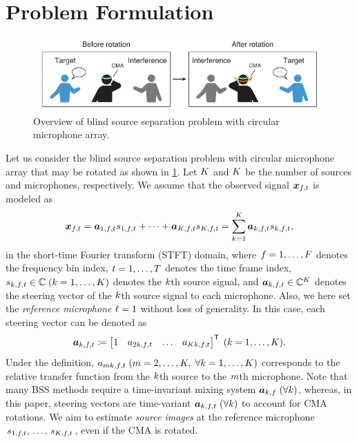 \documentclass[sip,biber]{now-journal}
\begin{document}
\section{Problem Formulation}\label{sec:problem}
\begin{figure}[t]
  \centering
  \includegraphics{figures/diagrams/bss.pdf}%
  \caption{Overview of blind source separation problem with circular microphone array.}%
  \label{fig:bss}
\end{figure}
Let us consider the blind source separation problem with circular microphone array that may be rotated as shown in \cref{fig:bss}.
Let $K$ and $K$ be the number of sources and microphones, respectively.
We assume that the observed signal $\Obs _{\ft}$ is modeled as
\begin{equation}
  \Obs _{\ft} = \steer _{1,\ft} \sig _{1,\ft} + \dots + \steer _{\Src,\ft} \sig _{\Src,\ft} = \sum _{\src=1} ^{\Src} \steer _{\src,\ft} \sig _{\src,\ft},\label{eq:mix}
\end{equation}
in the short-time Fourier transform (STFT) domain,
where $f = 1, \dots, F$ denotes the frequency bin index,
$t = 1, \dots, T$ denotes the time frame index,
$\sig _{\src,\ft} \in \C\; (\src = 1, \dots, \Src)$ denotes the $k$th source signal,
and $\steer _{\src,\ft} \in \C ^{\Mic}$ denotes the steering vector of the $k$th source signal to each microphone.
Also, we here set the \emph{reference microphone} $\ell = 1$ without loss of generality.
In this case, each steering vector can be denoted as
\begin{equation}
  \steer _{\src,\ft} \coloneqq \begin{bmatrix} 1 & \str _{2\src,\ft} & \dots & \str _{\Mic\src,\ft} \end{bmatrix} ^{\top}\; (\src = 1, \dots, \Src).
\end{equation}
Under the definition, $\str _{\mic\src,\ft} \; (\mic = 2, \dots, \Mic,\; \forall \src = 1, \dots, \Src)$ corresponds to the relative transfer function from the $k$th source to the $m$th microphone.
Note that many BSS methods require a time-invariant mixing system $\bm{a} _{k,f}\; (\forall k)$,
whereas, in this paper, steering vectors are time-variant $\steer _{\src,\ft}\; (\forall \src)$ to account for CMA rotations.
We aim to estimate \emph{source images} at the reference microphone $\sig _{1,\ft},\, \dots,\, \sig _{\Src,\ft}$, even if the CMA is rotated.
\end{document}
